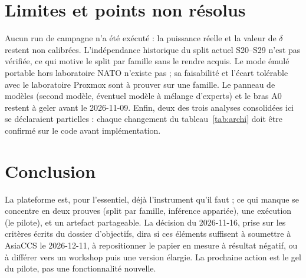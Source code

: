 \documentclass[11pt,a4paper]{article}
\begin{document}
\section{Limites et points non r\'esolus}
\label{sec:limites}

Aucun run de campagne n'a \'et\'e ex\'ecut\'e : la puissance r\'eelle et la valeur de $\delta$ restent non calibr\'ees. L'ind\'ependance historique du split actuel S20--S29 n'est pas v\'erifi\'ee, ce qui motive le split par famille sans le rendre acquis. Le mode \'emul\'e portable hors laboratoire NATO n'existe pas ; sa faisabilit\'e et l'\'ecart tol\'erable avec le laboratoire Proxmox sont \`a prouver sur une famille. Le panneau de mod\`eles (second mod\`ele, \'eventuel mod\`ele \`a m\'elange d'experts) et le bras A0 restent \`a geler avant le 2026-11-09. Enfin, deux des trois analyses consolid\'ees ici se d\'eclaraient partielles : chaque changement du tableau~\ref{tab:archi} doit \^etre confirm\'e sur le code avant impl\'ementation.

\section{Conclusion}

La plateforme est, pour l'essentiel, d\'ej\`a l'instrument qu'il faut ; ce qui manque se concentre en deux prouves (split par famille, inf\'erence appari\'ee), une ex\'ecution (le pilote), et un artefact partageable. La d\'ecision du 2026-11-16, prise sur les crit\`eres \'ecrits du dossier d'objectifs, dira si ces \'el\'ements suffisent \`a soumettre \`a AsiaCCS le 2026-12-11, \`a repositionner le papier en mesure \`a r\'esultat n\'egatif, ou \`a diff\'erer vers un workshop puis une version \'elargie. La prochaine action est le gel du pilote, pas une fonctionnalit\'e nouvelle.
\end{document}

